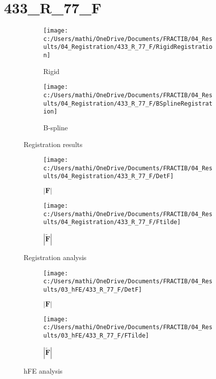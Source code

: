 \documentclass{article}%
\begin{document}
%
\newpage%
\section*{433\_R\_77\_F}%
\label{sec:433R77F}%


\begin{figure}[h!]%
\begin{subfigure}[b]{0.5\linewidth}%
\texttt{[image: c:/Users/mathi/OneDrive/Documents/FRACTIB/04\_Results/04\_Registration/433\_R\_77\_F/RigidRegistration]}%
\caption{Rigid}%
\end{subfigure}%
\begin{subfigure}[b]{0.5\linewidth}%
\texttt{[image: c:/Users/mathi/OneDrive/Documents/FRACTIB/04\_Results/04\_Registration/433\_R\_77\_F/BSplineRegistration]}%
\caption{B{-}spline}%
\end{subfigure}%
\caption{Registration results}%
\end{figure}

%


\begin{figure}[h!]%
\begin{subfigure}[b]{0.5\linewidth}%
\texttt{[image: c:/Users/mathi/OneDrive/Documents/FRACTIB/04\_Results/04\_Registration/433\_R\_77\_F/DetF]}%
\caption{$|\mathbf{F}|$}%
\end{subfigure}%
\begin{subfigure}[b]{0.5\linewidth}%
\texttt{[image: c:/Users/mathi/OneDrive/Documents/FRACTIB/04\_Results/04\_Registration/433\_R\_77\_F/Ftilde]}%
\caption{$|\widetilde{\mathbf{F}}|$}%
\end{subfigure}%
\caption{Registration analysis}%
\end{figure}

%


\begin{figure}[h!]%
\begin{subfigure}[b]{0.5\linewidth}%
\texttt{[image: c:/Users/mathi/OneDrive/Documents/FRACTIB/04\_Results/03\_hFE/433\_R\_77\_F/DetF]}%
\caption{$|\mathbf{F}|$}%
\end{subfigure}%
\begin{subfigure}[b]{0.5\linewidth}%
\texttt{[image: c:/Users/mathi/OneDrive/Documents/FRACTIB/04\_Results/03\_hFE/433\_R\_77\_F/FTilde]}%
\caption{$|\widetilde{\mathbf{F}}|$}%
\end{subfigure}%
\caption{hFE analysis}%
\end{figure}
\end{document}
